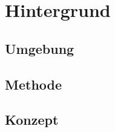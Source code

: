 
\chapter{Hintergrund} \label{chap:Hintergrund}
\minitoc\vspace{1em}
\Blindtext

\section{Umgebung} \label{sec:Umgebung}
\blindtext

\section{Methode} \label{sec:Methode}
\blindtext

\section{Konzept} \label{sec:Konzept}
\blindtext 

% 
% 
% 